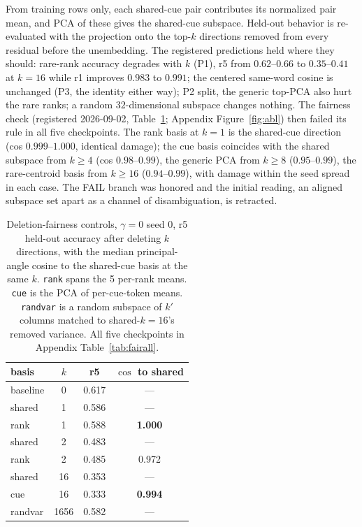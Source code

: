 \documentclass{article}
\begin{document}
From training rows only, each shared-cue pair contributes its normalized pair mean,
and PCA of these gives the shared-cue subspace. Held-out behavior is re-evaluated
with the projection onto the top-$k$ directions removed from every residual before
the unembedding. The registered predictions held where they should: rare-rank
accuracy degrades with $k$ (P1), r5 from $0.62$--$0.66$ to $0.35$--$0.41$ at
$k{=}16$ while r1 improves $0.983$ to $0.991$; the centered same-word cosine is
unchanged (P3, the identity either way); P2 split, the generic top-PCA also hurt the
rare ranks; a random $32$-dimensional subspace changes nothing. The fairness check
(registered 2026-09-02, Table~\ref{tab:fair}; Appendix Figure~\ref{fig:abl}) then
failed its rule in all five checkpoints. The rank basis at $k{=}1$ is the shared-cue
direction (cos $0.999$--$1.000$, identical damage); the cue basis coincides with the
shared subspace from $k{\ge}4$ (cos $0.98$--$0.99$), the generic PCA from $k{\ge}8$
($0.95$--$0.99$), the rare-centroid basis from $k{\ge}16$ ($0.94$--$0.99$), with
damage within the seed spread in each case. The FAIL branch was honored and the
initial reading, an aligned subspace set apart as a channel of disambiguation, is
retracted.

\begin{table}[t]
  \centering\footnotesize
  \caption{Deletion-fairness controls, $\gamma{=}0$ seed 0, r5 held-out accuracy
    after deleting $k$ directions, with the median principal-angle cosine to the
    shared-cue basis at the same $k$. \texttt{rank} spans the 5 per-rank means.
    \texttt{cue} is the PCA of per-cue-token means. \texttt{randvar} is a random
    subspace of $k'$ columns matched to shared-$k{=}16$'s removed variance. All
  five checkpoints in Appendix Table~\ref{tab:fairall}.}
  \label{tab:fair}
  \renewcommand{\arraystretch}{1.1}
  \begin{tabular}{@{}lccc@{}}
    \toprule
    basis & $k$ & r5 & $\cos$ to shared \\
    \midrule
    baseline & 0 & 0.617 & --- \\
    shared & 1 & 0.586 & --- \\
    rank & 1 & 0.588 & \textbf{1.000} \\
    shared & 2 & 0.483 & --- \\
    rank & 2 & 0.485 & 0.972 \\
    shared & 16 & 0.353 & --- \\
    cue & 16 & 0.333 & \textbf{0.994} \\
    randvar & 1656 & 0.582 & --- \\
    \bottomrule
  \end{tabular}
\end{table}
\end{document}
